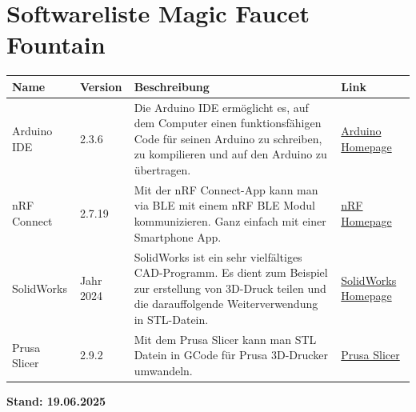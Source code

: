%
%


\chapter{Softwareliste Magic Faucet Fountain}\label{Software}

\begin{longtable}{p{3cm}p{2cm}p{5cm}p{4cm}}
	\textbf{Name} & \textbf{Version} & \textbf{Beschreibung} & \textbf{Link} \\
	\hline
	Arduino IDE 
	& 2.3.6 
	& Die Arduino IDE ermöglicht es, auf dem Computer einen funktionsfähigen Code für seinen Arduino zu schreiben, zu kompilieren und auf den Arduino zu übertragen.
	& \href{https://www.arduino.cc/}{Arduino Homepage} \\
	
	\hline
	nRF Connect
	& 2.7.19
	& Mit der nRF Connect-App kann man via BLE mit einem nRF BLE Modul kommunizieren. Ganz einfach mit einer Smartphone App.
	& \href{https://www.nordicsemi.com/}{nRF Homepage}\\
	
	\hline
	SolidWorks
	& Jahr 2024
	& SolidWorks ist ein sehr vielfältiges CAD-Programm. Es dient zum Beispiel zur erstellung von 3D-Druck teilen und die darauffolgende Weiterverwendung in STL-Datein.
	& \href{https://www.solidworks.com/de}{SolidWorks Homepage}\\
	
	\hline
	Prusa Slicer
	& 2.9.2
	& Mit dem Prusa Slicer kann man STL Datein in GCode für Prusa 3D-Drucker umwandeln.
	& \href{https://www.prusa3d.com/de/page/prusaslicer_424/}{Prusa Slicer}\\
	\hline

\end{longtable}

\textbf{Stand: 19.06.2025}
